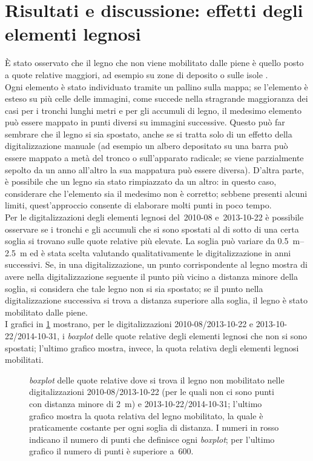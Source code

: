 \section{Risultati e discussione: effetti degli elementi legnosi}
È stato osservato che il legno che non viene mobilitato dalle piene è quello posto a quote relative maggiori, ad esempio su zone di deposito o sulle isole .
\\
Ogni elemento è stato individuato tramite un pallino sulla mappa; se l'elemento è esteso su più celle delle immagini, come succede nella stragrande maggioranza dei casi per i tronchi lunghi metri e per gli accumuli di legno, il medesimo elemento può essere mappato in punti diversi su immagini successive.
Questo può far sembrare che il legno si sia spostato, anche se si tratta solo di un effetto della digitalizzazione manuale (ad esempio un albero depositato su una barra può essere mappato a metà del tronco o sull'apparato radicale; se viene parzialmente sepolto da un anno all'altro la sua mappatura può essere diversa).
D'altra parte, è possibile che un legno sia stato rimpiazzato da un altro: in questo caso, considerare che l'elemento sia il medesimo non è corretto; sebbene presenti alcuni limiti, 	quest'approccio consente di elaborare molti punti in poco tempo.
\\
Per le digitalizzazioni degli elementi legnosi del~2010-08 e~2013-10-22 è possibile osservare se i tronchi e gli accumuli che si sono spostati al di sotto di una certa soglia si trovano sulle quote relative più elevate.
La soglia può variare da \SIrange[range-phrase = { a }]{0.5}{2.5}{\m} ed è stata scelta valutando qualitativamente le digitalizzazione in anni successivi.
Se, in una digitalizzazione, un punto corrispondente al legno mostra di avere nella digitalizzazione seguente il punto più vicino a distanza minore della soglia, si considera che tale legno non si sia spostato;
se il punto nella digitalizzazione successiva si trova a distanza superiore alla soglia, il legno è stato mobilitato dalle piene.
\\
I grafici in \cref{graph:elementi-dem-detrended-distanza} mostrano, per le digitalizzazioni 2010-08/2013-10-22 e 2013-10-22/2014-10-31, i \emph{boxplot} delle quote relative degli elementi legnosi che non si sono spostati;
l'ultimo grafico mostra, invece, la quota relativa degli elementi legnosi mobilitati.
%
\begin{figure}
	\centering
	
	\caption[\emph{boxplot} delle quote relative dove si trova il legno non mobilitato e mobilitato]{\emph{boxplot} delle quote relative dove si trova il legno non mobilitato nelle digitalizzazioni 2010-08/2013-10-22 (per le quali non ci sono punti con distanza minore di \SI{2}{\m}) e 2013-10-22/2014-10-31; l'ultimo grafico mostra la quota relativa del legno mobilitato, la quale è praticamente costante per ogni soglia di distanza.
	I numeri in rosso indicano il numero di punti che definisce ogni \emph{boxplot}; per l'ultimo grafico il numero di punti è superiore a~\num{600}.}
	\label{graph:elementi-dem-detrended-distanza}
\end{figure}
%

